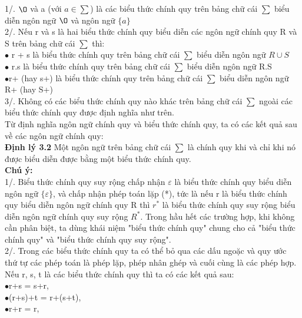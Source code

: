 \begin{flushleft}
1/. $\O$ và a (với $a \in \sum$) là các biểu thức chính quy trên bảng chữ cái $\sum$ biểu diễn ngôn ngữ $\O$ và ngôn ngữ $\{a\}$\\
2/. Nếu r và s là hai biểu thức chính quy biểu diễn các ngôn ngữ chính quy R và S trên bảng chữ cái $\sum$ thì:\\
\hspace{10mm}$\bullet$ r + s là biểu thức chính quy trên bảng chữ cái $\sum$ biểu diễn ngôn ngữ $R \cup S$\\
\hspace{10mm}$\bullet$ r.s là biểu thức chính quy trên bảng chữ cái $\sum$ biểu diễn ngôn ngữ R.S\\
\hspace{10mm}$\bullet$r+ (hay s+) là biểu thức chính quy trên bảng chữ cái $\sum$ biểu diễn ngôn ngữ R+ (hay S+)\\
3/. Không có các biểu thức chính quy nào khác trên bảng chữ cái $\sum$ ngoài các biểu thức chính quy được định nghĩa như trên.\\
Từ định nghĩa ngôn ngữ chính quy và biểu thức chính quy, ta có các kết quả sau về các ngôn ngữ chính quy:\\
\textbf{Định lý 3.2 }Một ngôn ngữ trên bảng chữ cái $\sum$ là chính quy khi và chỉ khi nó được biểu diễn được bằng một biểu thức chính quy.\\
\textbf{Chú ý:} \\
1/. Biểu thức chính quy suy rộng chấp nhận $\varepsilon$ là biểu thức chính quy biểu diễn ngôn ngữ $\{\varepsilon\}$, và chấp nhận phép toán lặp (*), tức là nếu r là biểu thức chính quy biểu diễn ngôn ngữ chính quy R thì $r^*$ là biểu thức chính quy suy rộng biểu diễn ngôn ngữ chính quy suy rộng $R^*$. Trong hầu hết các trường hợp, khi không cần phân biệt, ta dùng khái niệm "biểu thức chính quy" chung cho cả "biểu thức chính quy" và "biểu thức chính quy suy rộng".\\
2/. Trong các biểu thức chính quy ta có thể bỏ qua các dấu ngoặc và quy ước thứ tự các phép toán là phép lặp, phép nhân ghép và cuối cùng là các phép hợp.\\
Nếu r, s, t là các biểu thức chính quy thì ta có các kết quả sau:\\
\hspace{10mm}$\bullet$r+s = s+r,\\
\hspace{10mm}$\bullet$(r+s)+t = r+(s+t),\\
\hspace{10mm}$\bullet$r+r = r,\\

\end{flushleft}
